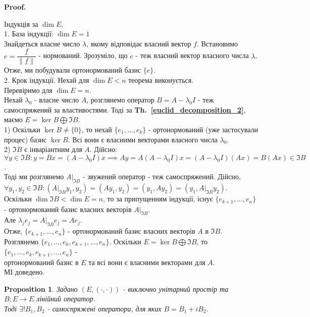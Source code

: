 \documentclass[a4paper, 10pt]{article}
\makeatletter
\theoremstyle{theoremdd}
\newtheorem{proposition}[theorem]{Proposition}
\newcommand\thref[1]{\textbf{Th.~\ref{#1}}}
\renewenvironment{proof}[1][Proof.\\]{\par
\pushQED{\hfill \qed}%
\normalfont \topsep6\p@\@plus6\p@\relax
\trivlist
\item\relax
{\bfseries
#1\@addpunct{.}}\hspace\labelsep\ignorespaces
}{%
\popQED\endtrivlist\@endpefalse
}
\makeatother
\begin{document}
\begin{proof}
Індукція за $\dim E$.\\
1. База індукції: $\dim E = 1$\\
Знайдеться власне число $\lambda$, якому відповідає власний вектор $f$. Встановимо $e = \dfrac{f}{\|f\|}$ - нормований. Зрозуміло, що $e$ - теж власний вектор власного числа $\lambda$.\\
Отже, ми побудували ортонормований базис $\{e\}$.
\bigskip \\
2. Крок індукції. Нехай для $\dim E < n$ теорема виконується.\\
Перевіримо для $\dim E = n$.\\
Нехай $\lambda_0$ - власне число $A$, розглянемо оператор $B = A - \lambda_0 I$ - теж самоспряжений за властивостями. Тоді за \thref{euclid_decomposition_2}, маємо $E = \ker B \bigoplus \Im B$.\\
1) Оскільки $\ker B \neq \{0\}$, то нехай $\{e_1,\dots,e_k\}$ - ортонормований (уже застосували процес) базис $\ker B$. Всі вони є власними векторами власного числа $\lambda_0$.\\
2) $\Im B$ є інваріантним для $A$. Дійсно:\\
$\forall y \in \Im B: y = Bx = (A-\lambda_0 I)x \implies Ay = A(A-\lambda_0 I)x = (A-\lambda_0 I)(Ax) = B(Ax) \in \Im B$.\\
Тоді ми розглянемо  $A|_{\Im B}$ - звужений оператор - теж самоспряжений. Дійсно,\\
$\forall y_1,y_2 \in \Im B: (A|_{\Im B} y_1, y_2) = (Ay_1, y_2) = (y_1, Ay_2) = (y_1, A|_{\Im B} y_2)$.\\
Оскільки $\dim \Im B < \dim E = n$, то за припущенням індукції, існує $\{e_{k+1},\dots,e_n\}$ - ортонормований базис власних векторів $A|_{\Im B}$.\\
Але $\lambda_j e_j = A|_{\Im B} e_j = Ae_j$.\\
Отже, $\{e_{k+1},\dots,e_n\}$ - ортонормований базис власних векторів $A$ в $\Im B$.\\
Розглянемо $\{e_1,\dots,e_k,e_{k+1},\dots,e_n\}$. Оскільки $E = \ker B \bigoplus \Im B$, то $\{e_1,\dots,e_k,e_{k+1},\dots,e_n\}$ - \\ ортонормований базис в $E$ та всі вони є власними векторами для $A$.\\
МІ доведено.
\end{proof}

\begin{proposition}
Задано $(E,(\cdot,\cdot))$ - виключно унітарний простір та $B \colon E \to E$ лінійний оператор.\\
Тоді $\exists! B_1,B_2$ - самоспряжені оператори, для яких $B = B_1 + i B_2$.
\end{proposition}
\end{document}
